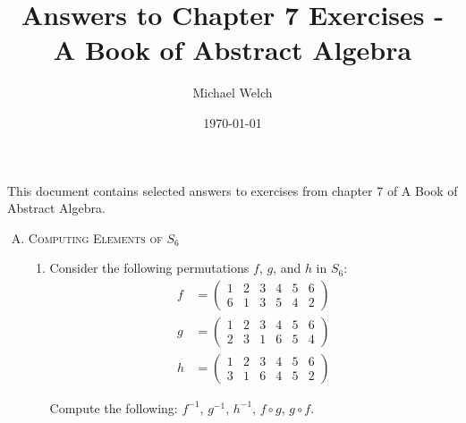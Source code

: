 \documentclass[twoside]{amsart}
\begin{document}
\title{Answers to Chapter 7 Exercises - A Book of Abstract Algebra}
\author{Michael Welch}
\date{\today}
\maketitle

This document contains selected answers to exercises from chapter 7
of A Book of Abstract Algebra.


\begin{enumerate}[A.]
   \item \textsc{Computing Elements of} $S_6$
   \begin{enumerate}[1]
      \item Consider the following permutations $f$, $g$, and $h$ in $S_6$:
      \begin{align*}
         f & = \begin{pmatrix}
	           1 & 2 & 3 & 4 & 5 & 6 \\
		   6 & 1 & 3 & 5 & 4 & 2
	       \end{pmatrix} \\
	 g & = \begin{pmatrix}
	           1 & 2 & 3 & 4 & 5 & 6 \\
		   2 & 3 & 1 & 6 & 5 & 4
	       \end{pmatrix} \\
	 h & = \begin{pmatrix}
	          1 & 2 & 3 & 4 & 5 & 6 \\
		  3 & 1 & 6 & 4 & 5 & 2
	       \end{pmatrix}
      \end{align*}

      Compute the following: $f^{-1}$, $g^{-1}$, $h^{-1}$, $f \circ g$,
      $g \circ f$.


\end{enumerate}
\end{enumerate}
\end{document}
